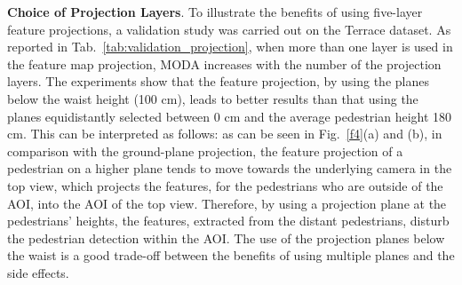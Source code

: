 \documentclass[runningheads]{llncs}
\begin{document}
	\textbf{Choice of Projection Layers}. To illustrate the benefits of using five-layer feature projections, a validation study was carried out on the Terrace dataset. As reported in Tab.~\ref{tab:validation_projection}, when more than one layer is used in the feature map projection, MODA increases with the number of the projection layers.
	The experiments show that the feature projection, by using the planes below the waist height (100 cm), leads to better results than that using the planes equidistantly selected between 0 cm and the average pedestrian height 180 cm. This can be interpreted as follows: as can be seen in Fig.~\ref{f4}(a) and (b), in comparison with the ground-plane projection, the feature projection of a pedestrian on a higher plane tends to move towards the underlying camera in the top view, which projects the features, for the pedestrians who are outside of the AOI, into the AOI of the top view. Therefore, by using a projection plane at the pedestrians' heights, the features, extracted from the distant pedestrians, disturb the pedestrian detection within the AOI. The use of the projection planes below the waist is a good trade-off between the benefits of using multiple planes and the side effects.
	\begin{table}[htbp]
		\centering
		\caption{Validation of the number of projection layers (with 3D Random Occlusion applied).}
		\label{tab:validation_projection}
	\end{table}
	
\end{document}
